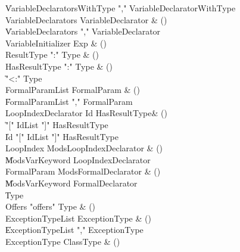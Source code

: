\begin{bbgrammar}

    \| VariableDeclaratorsWithType \xcd"," VariableDeclaratorWithType\\
 VariableDeclarators  \label{prod:VariableDeclarators}  \: VariableDeclarator & ()\\
    \| VariableDeclarators \xcd"," VariableDeclarator\\
 VariableInitializer  \label{prod:VariableInitializer}  \: Exp & ()\\
 ResultType  \label{prod:ResultType}  \: \xcd":" Type & ()\\
 HasResultType  \label{prod:HasResultType}  \: \xcd":" Type & ()\\
    \| \xcd"<:" Type\\
 FormalParamList  \label{prod:FormalParamList}  \: FormalParam & ()\\
    \| FormalParamList \xcd"," FormalParam\\
 LoopIndexDeclarator  \label{prod:LoopIndexDeclarator}  \: Id HasResultType\opt & ()\\
    \| \xcd"[" IdList \xcd"]" HasResultType\opt\\
    \| Id \xcd"[" IdList \xcd"]" HasResultType\opt\\
 LoopIndex  \label{prod:LoopIndex}  \: Mods\opt LoopIndexDeclarator & ()\\
    \| Mods\opt VarKeyword LoopIndexDeclarator\\
 FormalParam  \label{prod:FormalParam}  \: Mods\opt FormalDeclarator & ()\\
    \| Mods\opt VarKeyword FormalDeclarator\\
    \| Type\\
 Offers  \label{prod:Offers}  \: \xcd"offers" Type & ()\\
 ExceptionTypeList  \label{prod:ExceptionTypeList}  \: ExceptionType & ()\\
    \| ExceptionTypeList \xcd"," ExceptionType\\
 ExceptionType  \label{prod:ExceptionType}  \: ClassType & ()\\

\end{bbgrammar}
